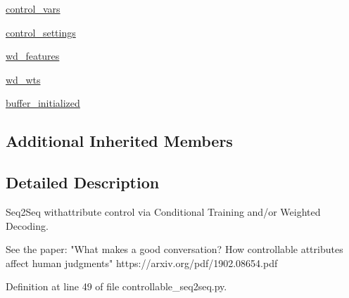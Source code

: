 \begin{DoxyCompactItemize}
\item 
\hyperlink{classprojects_1_1controllable__dialogue_1_1controllable__seq2seq_1_1controllable__seq2seq_1_1ControllableSeq2seqAgent_a60964f1450ffcd6b3ab7696a64e48cd5}{control\+\_\+vars}
\item 
\hyperlink{classprojects_1_1controllable__dialogue_1_1controllable__seq2seq_1_1controllable__seq2seq_1_1ControllableSeq2seqAgent_a10e17fad8f2e68b1610f64dc7d262d1a}{control\+\_\+settings}
\item 
\hyperlink{classprojects_1_1controllable__dialogue_1_1controllable__seq2seq_1_1controllable__seq2seq_1_1ControllableSeq2seqAgent_ae7d42c61a184691bb15d1ea65aee4c72}{wd\+\_\+features}
\item 
\hyperlink{classprojects_1_1controllable__dialogue_1_1controllable__seq2seq_1_1controllable__seq2seq_1_1ControllableSeq2seqAgent_a74800af89333cc27f221ed70dff41e4e}{wd\+\_\+wts}
\item 
\hyperlink{classprojects_1_1controllable__dialogue_1_1controllable__seq2seq_1_1controllable__seq2seq_1_1ControllableSeq2seqAgent_af675df0b6aa0c683d5da13151a82abe4}{buffer\+\_\+initialized}
\end{DoxyCompactItemize}
\subsection*{Additional Inherited Members}


\subsection{Detailed Description}
\begin{DoxyVerb}Seq2Seq withattribute control via Conditional Training and/or Weighted Decoding.

See the paper: "What makes a good conversation? How controllable attributes affect
human judgments" https://arxiv.org/pdf/1902.08654.pdf
\end{DoxyVerb}
 

Definition at line 49 of file controllable\+\_\+seq2seq.\+py.




